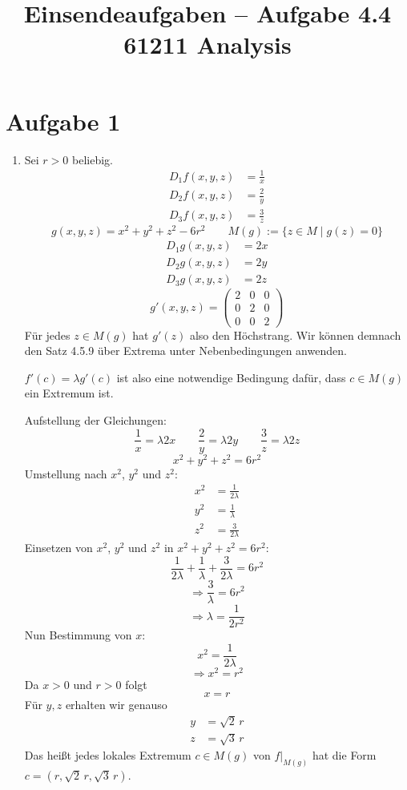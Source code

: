\documentclass[a4paper,12pt]{article}
\title{Einsendeaufgaben -- Aufgabe 4.4\\[0.5em]
\large 61211 Analysis}
\author{}
\date{}
\begin{document}
\maketitle

\section*{Aufgabe 1}

\begin{enumerate}[label=\alph*)]

    \item
    Sei $r > 0$ beliebig.
    \begin{align*}
        D_1 f(x,y,z) &= \frac{1}{x} \\
        D_2 f(x,y,z) &= \frac{2}{y} \\
        D_3 f(x,y,z) &= \frac{3}{z}
    \end{align*}
    \[
        g(x,y,z) = x^2 + y^2 + z^2 - 6r^2 \qquad M(g) := \{z \in M \mid g(z) = 0\}
    \]
    \begin{align*}
        D_1 g(x,y,z) &= 2x \\
        D_2 g(x,y,z) &= 2y \\
        D_3 g(x,y,z) &= 2z
    \end{align*}
    \[
        g'(x,y,z) = \begin{pmatrix} 2 & 0 & 0 \\ 0 & 2 & 0 \\ 0 & 0 & 2 \end{pmatrix}
    \]
    Für jedes $z \in M(g)$ hat $g'(z)$ also den Höchstrang. Wir können demnach den Satz 4.5.9 über Extrema unter Nebenbedingungen anwenden.

    $f'(c) = \lambda g'(c)$ ist also eine notwendige Bedingung dafür, dass $c \in M(g)$ ein Extremum ist.

    Aufstellung der Gleichungen:
    \[
        \frac{1}{x} = \lambda 2x \qquad \frac{2}{y} = \lambda 2y \qquad \frac{3}{z} = \lambda 2z
    \]
    \[
        x^2 + y^2 + z^2 = 6r^2
    \]
    Umstellung nach $x^2$, $y^2$ und $z^2$:
    \begin{align*}
        x^2 &= \frac{1}{2\lambda} \\
        y^2 &= \frac{1}{\lambda} \\
        z^2 &= \frac{3}{2\lambda}
    \end{align*}
    Einsetzen von $x^2$, $y^2$ und $z^2$ in $x^2 + y^2 + z^2 = 6r^2$:
    \[
        \frac{1}{2\lambda} + \frac{1}{\lambda} + \frac{3}{2\lambda} = 6r^2
    \]
    \[
        \Rightarrow \frac{3}{\lambda} = 6r^2
    \]
    \[
        \Rightarrow \lambda = \frac{1}{2r^2}
    \]
    Nun Bestimmung von $x$:
    \[
        x^2 = \frac{1}{2\lambda}
    \]
    \[
        \Rightarrow x^2 = r^2
    \]
    Da $x > 0$ und $r > 0$ folgt
    \[
        x = r
    \]
    Für $y, z$ erhalten wir genauso
    \begin{align*}
        y &= \sqrt{2}\, r \\
        z &= \sqrt{3}\, r
    \end{align*}
    Das heißt jedes lokales Extremum $c \in M(g)$ von $f|_{M(g)}$ hat die Form $c = (r, \sqrt{2}\, r, \sqrt{3}\, r)$.


\end{enumerate}
\end{document}
